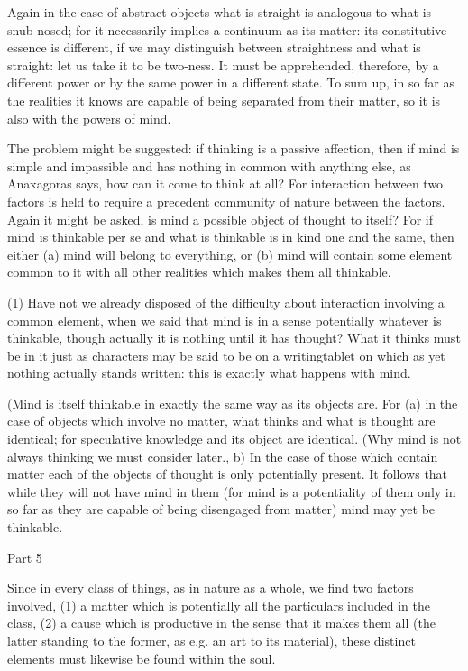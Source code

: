 Again in the case of abstract objects what is straight is analogous
to what is snub-nosed; for it necessarily implies a continuum as its
matter: its constitutive essence is different, if we may distinguish
between straightness and what is straight: let us take it to be two-ness.
It must be apprehended, therefore, by a different power or by the
same power in a different state. To sum up, in so far as the realities
it knows are capable of being separated from their matter, so it is
also with the powers of mind. 

The problem might be suggested: if thinking is a passive affection,
then if mind is simple and impassible and has nothing in common with
anything else, as Anaxagoras says, how can it come to think at all?
For interaction between two factors is held to require a precedent
community of nature between the factors. Again it might be asked,
is mind a possible object of thought to itself? For if mind is thinkable
per se and what is thinkable is in kind one and the same, then either
(a) mind will belong to everything, or (b) mind will contain some
element common to it with all other realities which makes them all
thinkable. 

(1) Have not we already disposed of the difficulty about interaction
involving a common element, when we said that mind is in a sense potentially
whatever is thinkable, though actually it is nothing until it has
thought? What it thinks must be in it just as characters may be said
to be on a writingtablet on which as yet nothing actually stands written:
this is exactly what happens with mind. 

(Mind is itself thinkable in exactly the same way as its objects are.
For (a) in the case of objects which involve no matter, what thinks
and what is thought are identical; for speculative knowledge and its
object are identical. (Why mind is not always thinking we must consider
later., b) In the case of those which contain matter each of the
objects of thought is only potentially present. It follows that while
they will not have mind in them (for mind is a potentiality of them
only in so far as they are capable of being disengaged from matter)
mind may yet be thinkable. 

Part 5

Since in every class of things, as in nature as a whole, we find two
factors involved, (1) a matter which is potentially all the particulars
included in the class, (2) a cause which is productive in the sense
that it makes them all (the latter standing to the former, as e.g.
an art to its material), these distinct elements must likewise be
found within the soul. 

